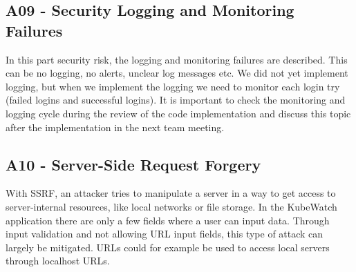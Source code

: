 \subsection{A09 - Security Logging and Monitoring Failures}
In this part security risk, the logging and monitoring failures are described. This can be no logging, no alerts, unclear log messages etc.
We did not yet implement logging, but when we implement the logging we need to monitor each login try (failed logins and successful logins). It is important to check the monitoring and logging cycle during the review of the code implementation and discuss this topic after the implementation in the next team meeting.

\subsection{A10 - Server-Side Request Forgery}
With SSRF, an attacker tries to manipulate a server in a way to get access to server-internal resources, like local networks or file storage.
In the KubeWatch application there are only a few fields where a user can input data. Through input validation and not allowing URL input fields, this type of attack can largely be mitigated. URLs could for example be used to access local servers through localhost URLs.
